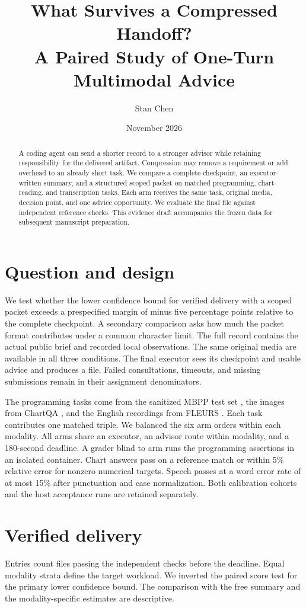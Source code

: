 \documentclass[10pt]{article}
\title{What Survives a Compressed Handoff?\protect\\A Paired Study of One-Turn Multimodal Advice}
\author{Stan Chen}
\date{November 2026}
\begin{document}
\maketitle
\begin{abstract}
A coding agent can send a shorter record to a stronger advisor while retaining responsibility for the delivered artifact. Compression may remove a requirement or add overhead to an already short task. We compare a complete checkpoint, an executor-written summary, and a structured scoped packet on matched programming, chart-reading, and transcription tasks. Each arm receives the same task, original media, decision point, and one advice opportunity. We evaluate the final file against independent reference checks. This evidence draft accompanies the frozen data for subsequent manuscript preparation.
\end{abstract}

\section{Question and design}
We test whether the lower confidence bound for verified delivery with a scoped packet exceeds a prespecified margin of minus five percentage points relative to the complete checkpoint. A secondary comparison asks how much the packet format contributes under a common character limit. The full record contains the actual public brief and recorded local observations. The same original media are available in all three conditions. The final executor sees its checkpoint and usable advice and produces a file. Failed consultations, timeouts, and missing submissions remain in their assignment denominators.

The programming tasks come from the sanitized MBPP test set \cite{mbpp}, the images from ChartQA \cite{chartqa}, and the English recordings from FLEURS \cite{fleurs}. Each task contributes one matched triple. We balanced the six arm orders within each modality. All arms share an executor, an advisor route within modality, and a 180-second deadline. A grader blind to arm runs the programming assertions in an isolated container. Chart answers pass on a reference match or within 5\% relative error for nonzero numerical targets. Speech passes at a word error rate of at most 15\% after punctuation and case normalization. Both calibration cohorts and the host acceptance runs are retained separately.

\section{Verified delivery}

\begin{center}\end{center}
Entries count files passing the independent checks before the deadline. Equal modality strata define the target workload. We inverted the paired score test for the primary lower confidence bound. The comparison with the free summary and the modality-specific estimates are descriptive.
\end{document}
